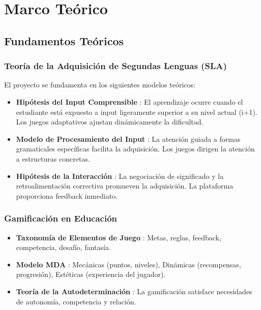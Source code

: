 \documentclass[12pt,a4paper]{article}
\begin{document}
\section{Marco Teórico}

\subsection{Fundamentos Teóricos}

\subsubsection{Teoría de la Adquisición de Segundas Lenguas (SLA)}

El proyecto se fundamenta en los siguientes modelos teóricos:

\begin{itemize}
    \item \textbf{Hipótesis del Input Comprensible} \cite{krashen1985}: El aprendizaje ocurre cuando el estudiante está expuesto a input ligeramente superior a su nivel actual (i+1). Los juegos adaptativos ajustan dinámicamente la dificultad.
    
    \item \textbf{Modelo de Procesamiento del Input} \cite{vanpatten1996}: La atención guiada a formas gramaticales específicas facilita la adquisición. Los juegos dirigen la atención a estructuras concretas.
    
    \item \textbf{Hipótesis de la Interacción} \cite{long1996}: La negociación de significado y la retroalimentación correctiva promueven la adquisición. La plataforma proporciona feedback inmediato.
\end{itemize}

\subsubsection{Gamificación en Educación}

\begin{itemize}
    \item \textbf{Taxonomía de Elementos de Juego} \cite{bedwell2012}: Metas, reglas, feedback, competencia, desafío, fantasía.
    
    \item \textbf{Modelo MDA} \cite{hunicke2004}: Mecánicas (puntos, niveles), Dinámicas (recompensas, progresión), Estéticas (experiencia del jugador).
    
    \item \textbf{Teoría de la Autodeterminación} \cite{ryan2000}: La gamificación satisface necesidades de autonomía, competencia y relación.
\end{itemize}
\end{document}
